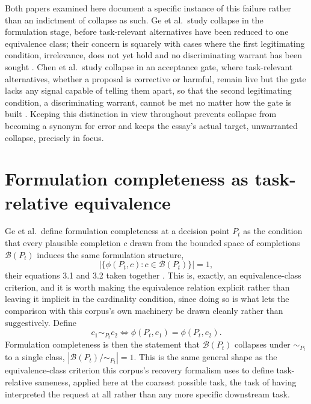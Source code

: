 \documentclass[11pt]{article}
\begin{document}
Both papers examined here document a specific instance of this failure rather than an indictment of collapse as such. Ge et al.\ study collapse in the formulation stage, before task-relevant alternatives have been reduced to one equivalence class; their concern is squarely with cases where the first legitimating condition, irrelevance, does not yet hold and no discriminating warrant has been sought \cite{ge2026ask}. Chen et al.\ study collapse in an acceptance gate, where task-relevant alternatives, whether a proposal is corrective or harmful, remain live but the gate lacks any signal capable of telling them apart, so that the second legitimating condition, a discriminating warrant, cannot be met no matter how the gate is built \cite{chen2026bilevel}. Keeping this distinction in view throughout prevents collapse from becoming a synonym for error and keeps the essay's actual target, unwarranted collapse, precisely in focus.

\section{Formulation completeness as task-relative equivalence}

Ge et al.\ define formulation completeness at a decision point $P_t$ as the condition that every plausible completion $c$ drawn from the bounded space of completions $\mathcal{B}(P_t)$ induces the same formulation structure,
$$\left|\{\phi(P_t, c) : c \in \mathcal{B}(P_t)\}\right| = 1,$$
their equations 3.1 and 3.2 taken together \cite{ge2026ask}. This is, exactly, an equivalence-class criterion, and it is worth making the equivalence relation explicit rather than leaving it implicit in the cardinality condition, since doing so is what lets the comparison with this corpus's own machinery be drawn cleanly rather than suggestively. Define
$$c_1 \sim_{P_t} c_2 \iff \phi(P_t, c_1) = \phi(P_t, c_2).$$
Formulation completeness is then the statement that $\mathcal{B}(P_t)$ collapses under $\sim_{P_t}$ to a single class, $|\mathcal{B}(P_t) / {\sim_{P_t}}| = 1$. This is the same general shape as the equivalence-class criterion this corpus's recovery formalism uses to define task-relative sameness, applied here at the coarsest possible task, the task of having interpreted the request at all rather than any more specific downstream task.
\end{document}
